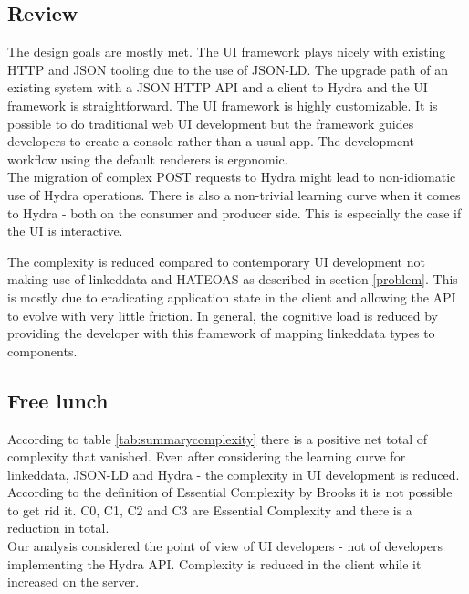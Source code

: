 \subsection{Review}
The design goals are mostly met. The UI framework plays nicely with existing HTTP and JSON tooling due to the use of JSON-LD. The upgrade path of an existing system with a JSON HTTP API and a client to Hydra and the UI framework is straightforward. The UI framework is highly customizable. It is possible to do traditional web UI development but the framework guides developers to create a \gls{console} rather than a usual app. The development workflow using the default renderers is ergonomic. \\
The migration of complex POST requests to Hydra might lead to non-idiomatic use of Hydra operations. There is also a non-trivial learning curve when it comes to Hydra - both on the consumer and producer side. This is especially the case if the UI is interactive.

The complexity is reduced compared to contemporary UI development not making use of \gls{linkeddata} and HATEOAS as described in section \ref{problem}. This is mostly due to eradicating application state in the client and allowing the API to evolve with very little friction. In general, the \gls{cognitive load} is reduced by providing the developer with this framework of mapping \gls{linkeddata} types to components.

\subsection{Free lunch}
According to table \ref{tab:summarycomplexity} there is a positive net total of complexity that vanished. Even after considering the learning curve for \gls{linkeddata}, JSON-LD and Hydra - the complexity in UI development is reduced. \\
According to the definition of Essential Complexity by Brooks it is not possible to get rid it. C0, C1, C2 and C3 are Essential Complexity and there is a reduction in total. \\
Our analysis considered the point of view of UI developers - not of developers implementing the Hydra API. Complexity is reduced in the client while it increased on the server.

